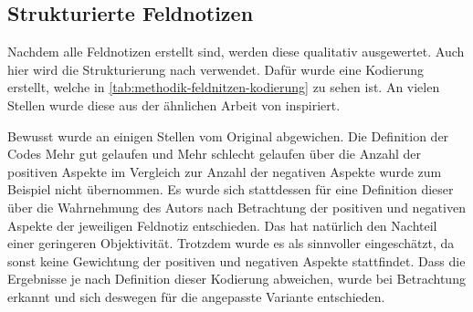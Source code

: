 \subsection{Strukturierte Feldnotizen}
\label{sec:methodik-auswertung-feldnotizen}

Nachdem alle Feldnotizen erstellt sind, werden diese qualitativ ausgewertet.
Auch hier wird die Strukturierung nach  verwendet.
Dafür wurde eine Kodierung erstellt, welche in \cref{tab:methodik-feldnitzen-kodierung} zu sehen ist.
An vielen Stellen wurde diese aus der ähnlichen Arbeit von  inspiriert.



Bewusst wurde an einigen Stellen vom Original abgewichen.
Die Definition der Codes \glqq Mehr gut gelaufen\grqq{} und \glqq Mehr schlecht gelaufen\grqq{} über die Anzahl der positiven Aspekte im Vergleich zur Anzahl der negativen Aspekte wurde zum Beispiel nicht übernommen.
Es wurde sich stattdessen für eine Definition dieser über die Wahrnehmung des Autors nach Betrachtung der positiven und negativen Aspekte der jeweiligen Feldnotiz entschieden.
Das hat natürlich den Nachteil einer geringeren Objektivität.
Trotzdem wurde es als sinnvoller eingeschätzt, da sonst keine Gewichtung der positiven und negativen Aspekte stattfindet.
Dass die Ergebnisse je nach Definition dieser Kodierung abweichen, wurde bei Betrachtung erkannt und sich deswegen für die angepasste Variante entschieden.

